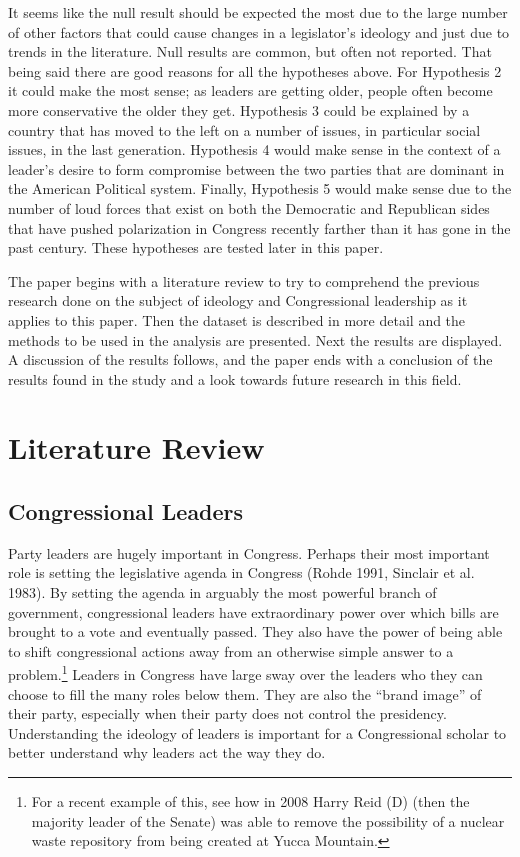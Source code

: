 \documentclass[12pt,twoside]{reedthesis}
\begin{document}
  It seems like the null result should be expected the most due to the
  large number of other factors that could cause changes in a legislator's
  ideology and just due to trends in the literature. Null results are
  common, but often not reported. That being said there are good reasons
  for all the hypotheses above. For Hypothesis 2 it could make the most
  sense; as leaders are getting older, people often become more
  conservative the older they get. Hypothesis 3 could be explained by a
  country that has moved to the left on a number of issues, in particular
  social issues, in the last generation. Hypothesis 4 would make sense in
  the context of a leader's desire to form compromise between the two
  parties that are dominant in the American Political system. Finally,
  Hypothesis 5 would make sense due to the number of loud forces that
  exist on both the Democratic and Republican sides that have pushed
  polarization in Congress recently farther than it has gone in the past
  century. These hypotheses are tested later in this paper.
  
  The paper begins with a literature review to try to comprehend the
  previous research done on the subject of ideology and Congressional
  leadership as it applies to this paper. Then the dataset is described in
  more detail and the methods to be used in the analysis are presented.
  Next the results are displayed. A discussion of the results follows, and
  the paper ends with a conclusion of the results found in the study and a
  look towards future research in this field.
  
  \chapter{Literature Review}\label{literature-review}
  
  \section{Congressional Leaders}\label{congressional-leaders}
  
  Party leaders are hugely important in Congress. Perhaps their most
  important role is setting the legislative agenda in Congress (Rohde
  1991, Sinclair et al. 1983). By setting the agenda in arguably the most
  powerful branch of government, congressional leaders have extraordinary
  power over which bills are brought to a vote and eventually passed. They
  also have the power of being able to shift congressional actions away
  from an otherwise simple answer to a problem.\footnote{For a recent
    example of this, see how in 2008 Harry Reid (D) (then the majority
    leader of the Senate) was able to remove the possibility of a nuclear
    waste repository from being created at Yucca Mountain.} Leaders in
  Congress have large sway over the leaders who they can choose to fill
  the many roles below them. They are also the ``brand image'' of their
  party, especially when their party does not control the presidency.
  Understanding the ideology of leaders is important for a Congressional
  scholar to better understand why leaders act the way they do.
  
\end{document}
